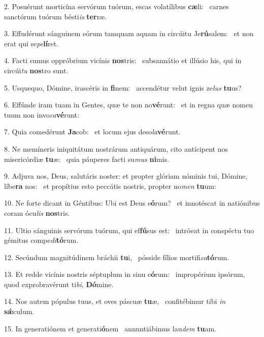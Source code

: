 2. Posuérunt morticína servórum tuórum, escas volatílibus \textbf{cæ}li: \ast\  carnes sanctórum tuórum bésti\textit{is} \textbf{ter}ræ.\

3. Effudérunt sánguinem eórum tamquam aquam in circúitu Je\textbf{rú}salem: \ast\  et non erat qui se\textit{pe}\textbf{lí}ret.\

4. Facti sumus oppróbrium vicínis \textbf{nos}tris: \ast\  subsannátio et illúsio his, qui in circúi\textit{tu} \textbf{nos}tro sunt.\

5. Usquequo, Dómine, irascéris in \textbf{fi}nem: \ast\  accendétur velut ignis ze\textit{lus} \textbf{tu}us?\

6. Effúnde iram tuam in Gentes, quæ te non no\textbf{vé}runt: \ast\  et in regna quæ nomen tuum non invo\textit{ca}\textbf{vé}runt:\

7. Quia comedérunt \textbf{Ja}cob: \ast\  et locum ejus deso\textit{la}\textbf{vé}runt.\

8. Ne memíneris iniquitátum nostrárum antiquárum, cito antícipent nos misericórdiæ \textbf{tu}æ: \ast\  quia páuperes facti su\textit{mus} \textbf{ni}mis.\

9. Adjuva nos, Deus, salutáris noster: et propter glóriam nóminis tui, Dómine, líbe\textbf{ra} nos: \ast\  et propítius esto peccátis nostris, propter no\textit{men} \textbf{tu}um:\

10. Ne forte dicant in Géntibus: Ubi est Deus e\textbf{ó}rum? \ast\  et innotéscat in natiónibus coram ócu\textit{lis} \textbf{nos}tris.\

11. Ultio sánguinis servórum tuórum, qui ef\textbf{fú}sus est: \ast\  intróeat in conspéctu tuo gémitus compe\textit{di}\textbf{tó}rum.\

12. Secúndum magnitúdinem bráchii \textbf{tu}i, \ast\  pósside fílios mortifi\textit{ca}\textbf{tó}rum.\

13. Et redde vicínis nostris séptuplum in sinu e\textbf{ó}rum: \ast\  impropérium ipsórum, quod exprobravérunt ti\textit{bi}, \textbf{Dó}mine.\

14. Nos autem pópulus tuus, et oves páscuæ \textbf{tu}æ, \ast\  confitébimur tibi \textit{in} \textbf{sǽ}culum.\

15. In generatiónem et generati\textbf{ó}nem \ast\  annuntiábimus lau\textit{dem} \textbf{tu}am.\

